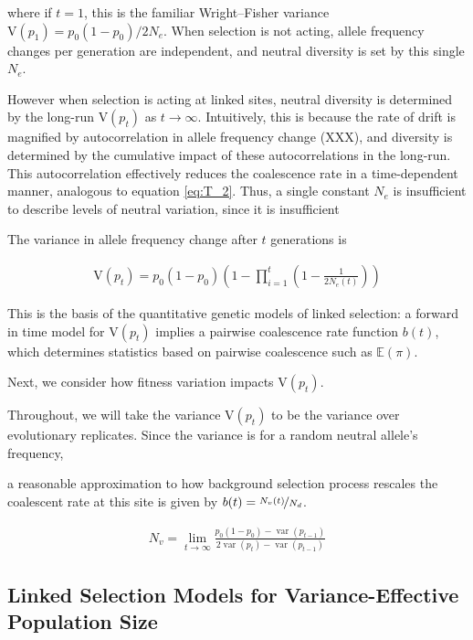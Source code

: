 \documentclass[11pt]{article}
\newcommand{\E}{\mathbb{E}}
\newcommand{\V}{\text{V}}
\DeclareMathOperator{\var}{var}
\begin{document}
where if $t=1$, this is the familiar Wright--Fisher variance $\V(p_1) =
p_0(1-p_0) / 2N_e$. When selection is not acting, allele frequency changes per
generation are independent, and neutral diversity is set by this
single $N_e$. 

However when selection is acting at linked sites, neutral diversity is
determined by the long-run $\V(p_t)$ as $t \to \infty$. Intuitively, this is
because the rate of drift is magnified by autocorrelation in allele frequency
change (XXX), and diversity is determined by the cumulative impact of these
autocorrelations in the long-run. This autocorrelation effectively reduces the
coalescence rate in a time-dependent manner, analogous to equation
\eqref{eq:T_2}. Thus, a single constant $N_e$ is insufficient to describe
levels of neutral variation, since it is insufficient 

The variance in allele frequency change after $t$ generations is

\begin{align}
  \V(p_t) = p_0(1-p_0)\left(1 - \prod_{i=1}^t \left(1-\frac{1}{2N_e(t)}\right)\right)
\end{align}

This is the basis of the quantitative genetic models of linked selection: a
forward in time model for $\V(p_t)$ implies a pairwise coalescence rate
function $b(t)$, which determines statistics based on pairwise coalescence such
as $\E(\pi)$.

Next, we consider how fitness variation impacts $\V(p_t)$.



Throughout, we will take the variance $\V(p_t)$ to be the variance over
evolutionary replicates. Since the variance is for a random neutral allele's
frequency, 






a reasonable approximation to how background selection process
rescales the coalescent rate at this site is given by $b(t) =
\nicefrac{N_v(t)}{N_d}$. 


\begin{align}
  N_v = \lim_{t \to \infty} \frac{p_0 (1 - p_0) - \var(p_{t-1})}{2\var(p_t) - \var(p_{t-1})}
\end{align}

\subsection*{Linked Selection Models for Variance-Effective Population Size}
\end{document}
